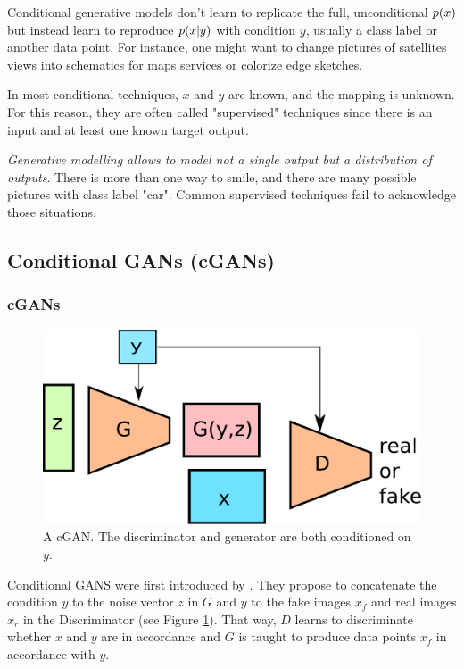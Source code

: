 Conditional generative models don't learn to replicate the full, unconditional $p(x)$ but instead learn to reproduce $p(x | y)$ with condition $y$, usually a class label or another data point. For instance, one might want to change pictures of satellites views into schematics for maps services or colorize edge sketches.

In most conditional techniques, $x$ and $y$ are known, and the mapping is unknown. For this reason, they are often called "supervised" techniques since there is an input and at least one known target output.

\emph{Generative modelling allows to model not a single output but a distribution of outputs}. There is more than one way to smile, and there are many possible pictures with class label "car". Common supervised techniques fail to acknowledge those situations.


\subsection{Conditional GANs (cGANs)}

\subsubsection{cGANs}

\begin{figure}
    \centering
    \includegraphics[width=0.5\columnwidth]{60-files/cgan.pdf}
    \caption{A cGAN. The discriminator and generator are both conditioned on $y$.}
    \label{fig:cgan}
\end{figure}

Conditional GANS were first introduced by \citet{cgan}. They propose to concatenate the condition $y$ to the noise vector $z$ in $G$ and $y$ to the fake images $x_f$ and  real images $x_r$ in the Discriminator (see Figure \ref{fig:cgan}). That way, $D$ learns to discriminate whether $x$ and $y$ are in accordance and $G$ is taught to produce data points $x_f$ in accordance with $y$.

